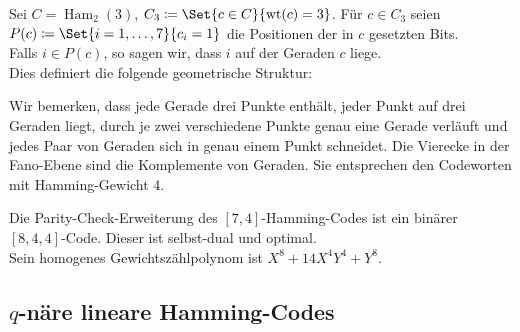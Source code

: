 \documentclass{cheat-sheet}
\newcommand{\F}{\mathbb{F}} %
\DeclareMathOperator{\wt}{wt} %
\DeclareMathOperator{\Ham}{Ham} %
\begin{document}
\begin{bem}
  Sei $C = \Ham_2(3)$, $C_3 \coloneqq \Set{c \in C}{\wt(c) = 3}$.
  Für $c \in C_3$ seien $P(c) \coloneqq \Set{i = 1, \ldots, 7}{c_i = 1}$ die Positionen der in $c$ gesetzten Bits. \\
  Falls $i \in P(c)$, so sagen wir, dass $i$ auf der Geraden $c$ liege. \\
  Dies definiert die folgende geometrische Struktur:
\begin{center}
\end{center}
  Wir bemerken, dass jede Gerade drei Punkte enthält, jeder Punkt auf drei Geraden liegt, durch je zwei verschiedene Punkte genau eine Gerade verläuft und jedes Paar von Geraden sich in genau einem Punkt schneidet.
  Die Vierecke in der Fano-Ebene sind die Komplemente von Geraden.
  Sie entsprechen den Codeworten mit Hamming-Gewicht 4.
\end{bem}


\begin{samepage}

\begin{satz}
  Die Parity-Check-Erweiterung des $[7, 4]$-Hamming-Codes ist ein binärer $[8, 4, 4]$-Code.
  Dieser ist selbst-dual und optimal. \\
  Sein homogenes Gewichtszählpolynom ist $X^8 + 14 X^4 Y^4 + Y^8$.
\end{satz}

\subsection{$q$-näre lineare Hamming-Codes}

\end{samepage}
\end{document}
